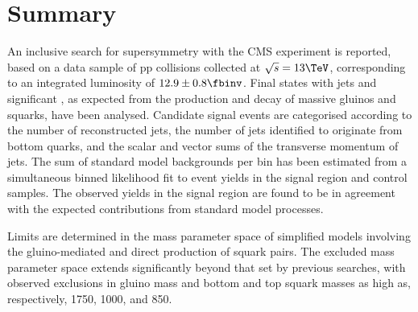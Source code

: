 \section{Summary}
\label{sec:summary}

An inclusive search for supersymmetry with the CMS experiment is
reported, based on a data sample of pp collisions collected at
$\sqrt{s} = 13\TeV$, corresponding to an integrated luminosity of $12.9
\pm 0.8 \fbinv$. Final states with jets and significant \ptvecmiss, as
expected from the production and decay of massive gluinos and squarks,
have been analysed. Candidate signal events are categorised according
to the number of reconstructed jets, the number of jets identified to
originate from bottom quarks, and the scalar and vector sums of the
transverse momentum of jets. The sum of standard model backgrounds per
bin has been estimated from a simultaneous binned likelihood fit to
event yields in the signal region and control samples. The observed
yields in the signal region are found to be in agreement with the
expected contributions from standard model processes. 

Limits are determined in the mass parameter space of simplified models
involving the gluino-mediated and direct production of squark
pairs. The excluded mass parameter space extends significantly beyond
that set by previous searches, with observed exclusions in gluino mass
and bottom and top squark masses as high as, respectively, 1750, 1000,
and 850\GeV.

